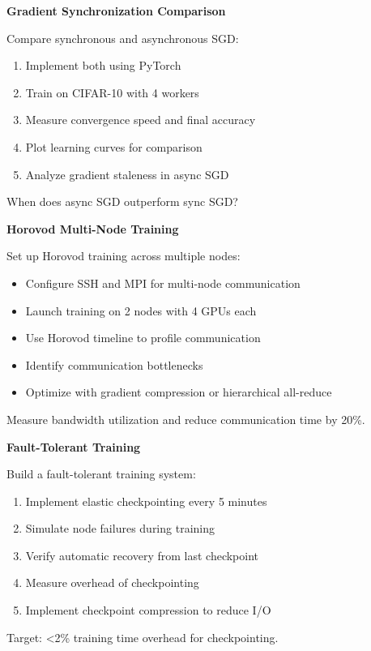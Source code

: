 \begin{exercise}
\textbf{Gradient Synchronization Comparison}

Compare synchronous and asynchronous SGD:
\begin{enumerate}
    \item Implement both using PyTorch
    \item Train on CIFAR-10 with 4 workers
    \item Measure convergence speed and final accuracy
    \item Plot learning curves for comparison
    \item Analyze gradient staleness in async SGD
\end{enumerate}

When does async SGD outperform sync SGD?
\end{exercise}

\begin{exercise}
\textbf{Horovod Multi-Node Training}

Set up Horovod training across multiple nodes:
\begin{itemize}
    \item Configure SSH and MPI for multi-node communication
    \item Launch training on 2 nodes with 4 GPUs each
    \item Use Horovod timeline to profile communication
    \item Identify communication bottlenecks
    \item Optimize with gradient compression or hierarchical all-reduce
\end{itemize}

Measure bandwidth utilization and reduce communication time by 20\%.
\end{exercise}

\begin{exercise}
\textbf{Fault-Tolerant Training}

Build a fault-tolerant training system:
\begin{enumerate}
    \item Implement elastic checkpointing every 5 minutes
    \item Simulate node failures during training
    \item Verify automatic recovery from last checkpoint
    \item Measure overhead of checkpointing
    \item Implement checkpoint compression to reduce I/O
\end{enumerate}

Target: <2\% training time overhead for checkpointing.
\end{exercise}

